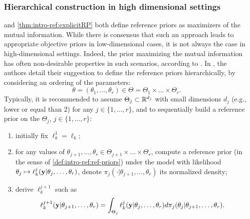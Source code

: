 \subsubsection{Hierarchical construction in high dimensional settings}

 and \cref{thm:intro-ref:explicitRP}
both define reference priors as maximizers of the mutual information.
While there is consensus that such an approach leads to appropriate objective priors in low-dimensional cases, it is not always the case in high-dimensional settings.
Indeed, the prior maximizing the mutual information has often non-desirable properties in such scenarios, according to \citet{berger_overall_2015}. %
In \cite{berger_development_1992}, the authors detail their suggestion to define the reference priors hierarchically, by considering an ordering of the parameters:
 \begin{equation}\label{eq:intro-ref:hierartheta}
     \theta = (\theta_1,\dots,\theta_r) \in \Theta=\Theta_1\times\dots\times\Theta_r.
 \end{equation}
Typically, it is recommended to assume $\Theta_j\subset\mathbb{R}^{d_j}$ with small dimensions $d_j$ (e.g., lower or equal than $2$) for any $j\in\{1,\dots,r\}$, and to sequentially build a reference prior on the $\Theta_j$,  $j\in\{1,\dots,r\}$:
 \begin{enumerate}
     \item initially fix $\ell_k^1=\ell_k$;
     \item for any values of $\theta_{j+1},\dots,\theta_r\in\Theta_{j+1}\times\dots\times\Theta_r$, compute a reference prior (in the sense of \cref{def:intro-ref:ref-priors})  under the model with likelihood $\theta_j\mapsto\ell_k^j(\mathbf{y}|\theta_j,\dots,\theta_r)$, denote $\pi_j(\cdot|\theta_{j+1},\dots,\theta_r)$ its normalized density;
     \item derive $\ell_k^{j+1}$ such as 
         \begin{equation}\label{eq:hier:condlikeint}
            \ell_k^{j+1}(\mathbf{y}|\theta_{j+1},\dots,\theta_r) =  \int_{\Theta_j}\ell_k^j(\mathbf{y}|\theta_j,\dots,\theta_r)d\pi_j(\theta_j|\theta_{j+1},\dots,\theta_r).
         \end{equation}
 \end{enumerate}


